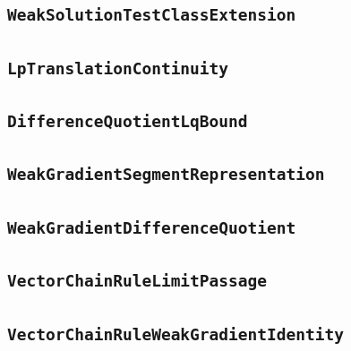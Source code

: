 \documentclass[11pt]{amsart}
\theoremstyle{definition}
\begin{document}
\subsection{\texorpdfstring{\texttt{WeakSolutionTestClassExtension}}{WeakSolutionTestClassExtension}}\label{node:WeakSolutionTestClassExtension}


\subsection{\texorpdfstring{\texttt{LpTranslationContinuity}}{LpTranslationContinuity}}\label{node:LpTranslationContinuity}


\subsection{\texorpdfstring{\texttt{DifferenceQuotientLqBound}}{DifferenceQuotientLqBound}}\label{node:DifferenceQuotientLqBound}


\subsection{\texorpdfstring{\texttt{WeakGradientSegmentRepresentation}}{WeakGradientSegmentRepresentation}}\label{node:WeakGradientSegmentRepresentation}


\subsection{\texorpdfstring{\texttt{WeakGradientDifferenceQuotient}}{WeakGradientDifferenceQuotient}}\label{node:WeakGradientDifferenceQuotient}


\subsection{\texorpdfstring{\texttt{VectorChainRuleLimitPassage}}{VectorChainRuleLimitPassage}}\label{node:VectorChainRuleLimitPassage}


\subsection{\texorpdfstring{\texttt{VectorChainRuleWeakGradientIdentity}}{VectorChainRuleWeakGradientIdentity}}\label{node:VectorChainRuleWeakGradientIdentity}

\end{document}

